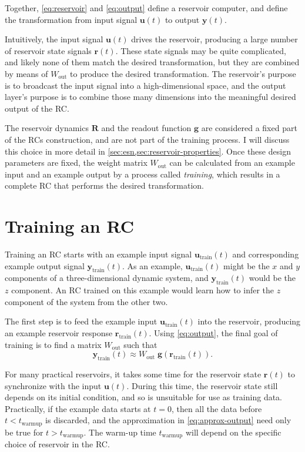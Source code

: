 Together, \cref{eq:reservoir} and \cref{eq:output} define a reservoir
computer, and define the transformation from input signal $\bm{u}(t)$
to output $\bm{y}(t)$.

Intuitively, the input signal $\bm{u}(t)$ drives the reservoir,
producing a large number of reservoir state signals $\bm{r}(t)$. These
state signals may be quite complicated, and likely none of them match
the desired transformation, but they are combined by means of
$W_\text{out}$ to produce the desired transformation. The reservoir's
purpose is to broadcast the input signal into a high-dimensional
space, and the output layer's purpose is to combine those many dimensions
into the meaningful desired output of the RC.

The reservoir dynamics $\bm{R}$ and the readout function $\bm{g}$ are
considered a fixed part of the RCs construction, and are not part of
the training process. I will discuss this choice in more detail in
\cref{sec:esn,sec:reservoir-properties}. Once these design parameters
are fixed, the weight matrix $W_\text{out}$ can be calculated from an
example input and an example output by a process called
\emph{training}, which results in a complete RC that performs the desired
transformation.

\section{Training an RC}\label{sec:training}

Training an RC starts with an example input signal
$\bm{u}_\text{train}(t)$ and corresponding example output signal
$\bm{y}_\text{train}(t)$. As an example, $\bm{u}_\text{train}(t)$ might be
the $x$ and $y$ components of a three-dimensional dynamic system, and
$\bm{y}_\text{train}(t)$ would be the $z$ component. An RC trained on this
example would learn how to infer the $z$ component of the system from
the other two.

The first step is to feed the example input $\bm{u}_\text{train}(t)$ into the reservoir, producing an example reservoir response $\bm{r}_\text{train}(t)$. Using \cref{eq:output}, the final goal of training is to find a matrix $W_\text{out}$ such that
\begin{equation}
  \label{eq:approx-output}
  \mathbf{y}_\text{train}(t) \approx W_\text{out}\;\mathbf{g}\left(\mathbf{r}_\text{train}(t)\right).
\end{equation}

For many practical reservoirs, it takes some time for the reservoir
state $\bm{r}(t)$ to synchronize with the input $\bm{u}(t)$. During
this time, the reservoir state still depends on its initial condition,
and so is unsuitable for use as training data. Practically, if the
example data starts at $t = 0$, then all the data before $t <
t_\text{warmup}$ is discarded, and the approximation in
\cref{eq:approx-output} need only be true for $t >
t_\text{warmup}$. The warm-up time $t_\text{warmup}$ will depend on the
specific choice of reservoir in the RC.

